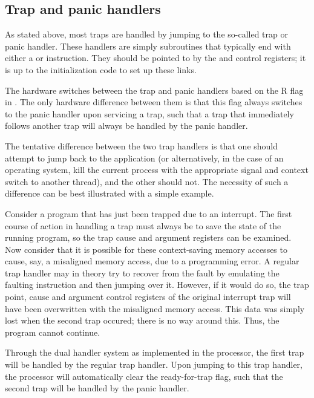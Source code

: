 \subsection{Trap and panic handlers}
\label{sec:core-ug-traps-handlers}

As stated above, most traps are handled by jumping to the so-called trap or
panic handler. These handlers are simply subroutines that typically end with
either a  or  instruction. They should be pointed to by
the  and  control registers; it is up to the initialization
code to set up these links.

The hardware switches between the trap and panic handlers based on the R flag
in . The only hardware difference between them is that this flag
always switches to the panic handler upon servicing a trap, such that a trap
that immediately follows another trap will always be handled by the panic
handler.

The tentative difference between the two trap handlers is that one should 
attempt to jump back to the application (or alternatively, in the case of an 
operating system, kill the current process with the appropriate signal and 
context switch to another thread), and the other should not. The necessity of 
such a difference can be best illustrated with a simple example.

Consider a program that has just been trapped due to an interrupt. The first 
course of action in handling a trap must always be to save the state of the 
running program, so the trap cause and argument registers can be examined. Now 
consider that it is possible for these context-saving memory accesses to cause, 
say, a misaligned memory access, due to a programming error. A regular trap 
handler may in theory try to recover from the fault by emulating the faulting 
instruction and then jumping over it. However, if it would do so, the trap 
point, cause and argument control registers of the original interrupt trap will 
have been overwritten with the misaligned memory access. This data was simply
lost when the second trap occured; there is no way around this. Thus, the
program cannot continue.

Through the dual handler system as implemented in the \rvex{} processor, the
first trap will be handled by the regular trap handler. Upon jumping to this
trap handler, the processor will automatically clear the ready-for-trap flag,
such that the second trap will be handled by the panic handler.


